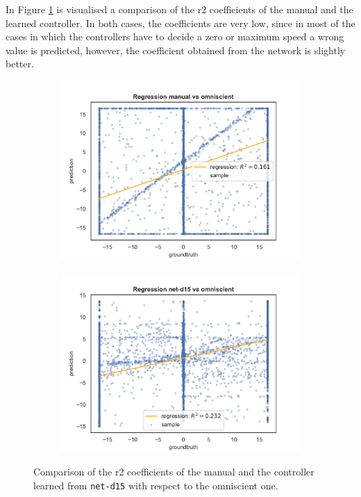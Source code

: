 In Figure \ref{fig:net-d15r2} is visualised a comparison of the \gls{r2} 
coefficients of the manual and the learned controller. In both cases, the 
coefficients are very low, since in most of the cases in which the controllers have 
to decide a zero or maximum speed a wrong value is predicted, however, the 
coefficient obtained from the network is slightly better.
\begin{figure}[!htb]
	\centering
	\begin{subfigure}[h]{0.49\textwidth}
		\centering
		\includegraphics[width=\textwidth]{contents/images/net-d15/regression-manualvsomniscient}%
	\end{subfigure}
	\hfill
	\begin{subfigure}[h]{0.49\textwidth}
		\centering
		\includegraphics[width=\textwidth]{contents/images/net-d15/regression-net-d15-vs-omniscient}
	\end{subfigure}
	\caption[Evaluation of the \gls{r2} coefficients of \texttt{net-d15} 
	.]{Comparison of the \gls{r2} coefficients of the manual and the controller 
		learned from \texttt{net-d15} with respect to the omniscient one.}
	\label{fig:net-d15r2}
\end{figure}

